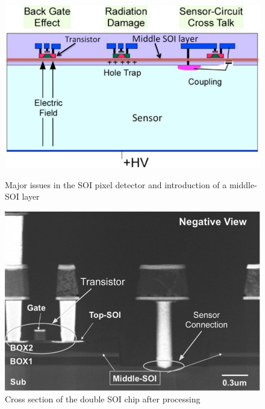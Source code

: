 \begin{figure}
 \begin{minipage}[t]{0.49\textwidth}
\centering     \includegraphics*[width=\textwidth,keepaspectratio]{VertexDetector/SOI/SOI_Schematic}
\caption{Major issues in the SOI pixel detector and introduction of a middle-SOI layer}
\label{fig:VertexDetector:SOI:SOI_Schematic}
 \end{minipage}
 \hfill
 \begin{minipage}[t]{0.49\textwidth}
 \centering
    \includegraphics*[width=\textwidth,keepaspectratio]{VertexDetector/SOI/crossSectionAfterProcessing}
	\caption{Cross section of the double SOI chip after processing}
	\label{fig:VertexDetector:SOI:crossSectionAfterProcessing}
 \end{minipage}
 \end{figure}

